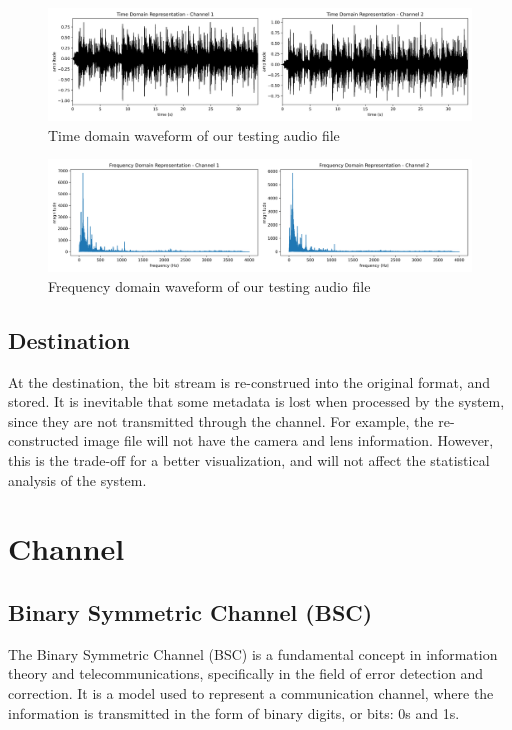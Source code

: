 \documentclass{article}
\begin{document}
\begin{figure}[htb]
    \centering
    \includegraphics[width=\textwidth]{../Result/wav-time-domain-TX.png}
    \caption{Time domain waveform of our testing audio file}
    \label{fig:our-audio-time-domain}
\end{figure}

\begin{figure}[htb]
    \centering
    \includegraphics[width=\textwidth]{../Result/wav-frequency-domain-TX.png}
    \caption{Frequency domain waveform of our testing audio file}
    \label{fig:our-audio-frequency-domain}
\end{figure}







\subsection{Destination}
At the destination, the bit stream is re-construed into the original format, and stored. 
It is inevitable that some metadata is lost when processed by the system, since they are not transmitted through the channel.
For example, the re-constructed image file will not have the camera and lens information. 
However, this is the trade-off for a better visualization, and will not affect the statistical analysis of the system.








\section{Channel}

\subsection{Binary Symmetric Channel (BSC)}
The Binary Symmetric Channel (BSC) is a fundamental concept in information theory and telecommunications, specifically in the field of error detection and correction. It is a model used to represent a communication channel, where the information is transmitted in the form of binary digits, or bits: 0s and 1s.
\end{document}
